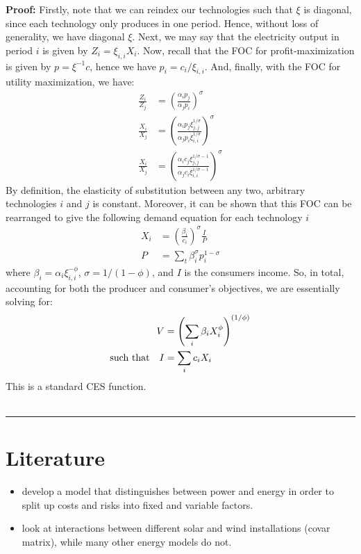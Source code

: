 \documentclass[11pt,a4paper]{extarticle}
\newenvironment{proof}[1][Proof]{\noindent\textbf{#1:} }{\ \rule{0.5em}{0.5em}}
\begin{document}
\begin{proof}
	Firstly, note that we can reindex our technologies such that $\xi$ is diagonal, since each technology only produces in one period. Hence, without loss of generality, we have diagonal $\xi$. Next, we may say that the electricity output in period $i$ is given by $Z_i = \xi_{i,i} X_i$. Now, recall that the FOC for profit-maximization is given by $p = \xi^{-1} c$, hence we have $p_i = c_i / \xi_{i,i}$.  And, finally, with the FOC for utility maximization, we have:
	\begin{align*}
	\frac{Z_i}{Z_j} &= \left( \frac{\alpha_i p_j}{\alpha_j p_i} \right)^\sigma \\
	\frac{ X_i }{X_j} &= \left( \frac{ \alpha_i p_j \xi_{j,j}^{1/\sigma} }{ \alpha_j p_i \xi_{i,i}^{1/\sigma} } \right)^\sigma \\
	\frac{ X_i }{X_j} &= \left( \frac{ \alpha_i c_j \xi_{j,j}^{1/\sigma - 1} }{ \alpha_j c_i \xi_{i,i}^{1/\sigma - 1} } \right)^\sigma
	\end{align*}
	By definition, the elasticity of substitution between any two, arbitrary technologies $i$ and $j$ is constant. Moreover, it can be shown that this FOC can be rearranged to give the following demand equation for each technology $i$
	\begin{align}
	X_i &= \left(\frac{\beta_i}{c_i} \right)^\sigma \frac{I}{P} \\
	P &= \sum_t \beta_i^\sigma p_i^{1-\sigma}
	\end{align}
	where $\beta_i = \alpha_i \xi_{i,i}^{-\phi}$, $\sigma = 1 / (1-\phi)$, and $I$ is the consumers income.	So, in total, accounting for both the producer and consumer's objectives, we are essentially solving for: 
	\begin{align*} 
	V &= \left( \sum_i \beta_i X_i^\phi \right)^{(1/\phi)}  \\
	\text{such that\quad} I &= \sum_i c_i X_i 
	\end{align*}
	This is a standard CES function.
	\\ \hfill
\end{proof}


\section{Literature}

\begin{itemize}
	\item \cite{Delarue} develop a model that distinguishes between power and energy in order to split up costs and risks into fixed and variable factors. 
	\item \cite{SB2018} look at interactions between different solar and wind installations (covar matrix), while many other energy models do not.
\end{itemize}
\end{document}
